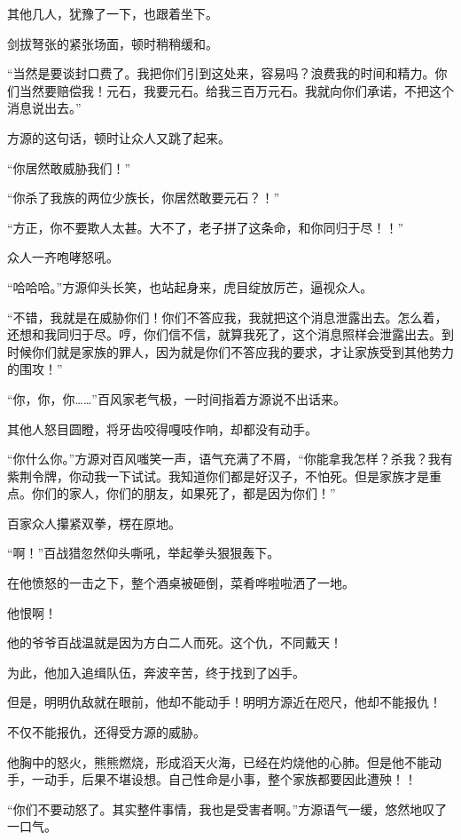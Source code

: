 \begin{this_body}
其他几人，犹豫了一下，也跟着坐下。

剑拔弩张的紧张场面，顿时稍稍缓和。

“当然是要谈封口费了。我把你们引到这处来，容易吗？浪费我的时间和精力。你们当然要赔偿我！元石，我要元石。给我三百万元石。我就向你们承诺，不把这个消息说出去。”

方源的这句话，顿时让众人又跳了起来。

“你居然敢威胁我们！”

“你杀了我族的两位少族长，你居然敢要元石？！”

“方正，你不要欺人太甚。大不了，老子拼了这条命，和你同归于尽！！”

众人一齐咆哮怒吼。

“哈哈哈。”方源仰头长笑，也站起身来，虎目绽放厉芒，逼视众人。

“不错，我就是在威胁你们！你们不答应我，我就把这个消息泄露出去。怎么着，还想和我同归于尽。哼，你们信不信，就算我死了，这个消息照样会泄露出去。到时候你们就是家族的罪人，因为就是你们不答应我的要求，才让家族受到其他势力的围攻！”

“你，你，你……”百风家老气极，一时间指着方源说不出话来。

其他人怒目圆瞪，将牙齿咬得嘎吱作响，却都没有动手。

“你什么你。”方源对百风嗤笑一声，语气充满了不屑，“你能拿我怎样？杀我？我有紫荆令牌，你动我一下试试。我知道你们都是好汉子，不怕死。但是家族才是重点。你们的家人，你们的朋友，如果死了，都是因为你们！”

百家众人攥紧双拳，楞在原地。

“啊！”百战猎忽然仰头嘶吼，举起拳头狠狠轰下。

在他愤怒的一击之下，整个酒桌被砸倒，菜肴哗啦啦洒了一地。

他恨啊！

他的爷爷百战温就是因为方白二人而死。这个仇，不同戴天！

为此，他加入追缉队伍，奔波辛苦，终于找到了凶手。

但是，明明仇敌就在眼前，他却不能动手！明明方源近在咫尺，他却不能报仇！

不仅不能报仇，还得受方源的威胁。

他胸中的怒火，熊熊燃烧，形成滔天火海，已经在灼烧他的心肺。但是他不能动手，一动手，后果不堪设想。自己性命是小事，整个家族都要因此遭殃！！

“你们不要动怒了。其实整件事情，我也是受害者啊。”方源语气一缓，悠然地叹了一口气。


\end{this_body}
